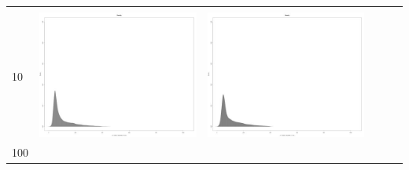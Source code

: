 \begin{table}[htbp]
{\begin{tabular}{l | ccccc}
\begin{minipage}{.15\textwidth}
    				 \end{minipage}\\			
		10	   & \begin{minipage}{.15\textwidth}
     			 	\includegraphics[width=\linewidth]{images/mema-dens-graph/I2}
    				\end{minipage}
    			   & \begin{minipage}{.15\textwidth}
     			 	\includegraphics[width=\linewidth]{images/mema-dens-graph/I6}
    				 \end{minipage}\\		
		100	   & \begin{minipage}{.15\textwidth}

\end{minipage}
\end{tabular}}
\end{table}
